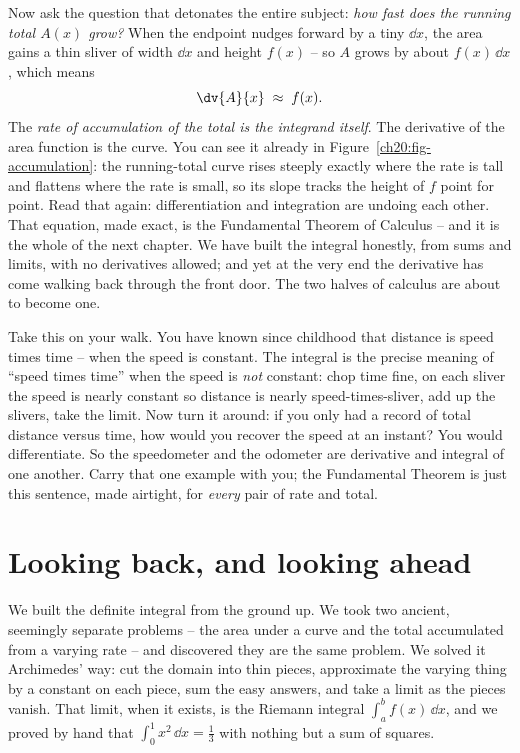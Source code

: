 Now ask the question that detonates the entire subject: \emph{how fast does the
running total $A(x)$ grow?} When the endpoint nudges forward by a tiny $\dd x$,
the area gains a thin sliver of width $\dd x$ and height $f(x)$ -- so
$A$ grows by about $f(x)\,\dd x$, which means
\[
  \dv{A}{x} \;\approx\; f(x).
\]
The \emph{rate of accumulation of the total is the integrand itself}. The
derivative of the area function is the curve. You can see it already in
Figure~\ref{ch20:fig-accumulation}: the running-total curve rises steeply
exactly where the rate is tall and flattens where the rate is small, so its
slope tracks the height of $f$ point for point. Read that again: differentiation
and integration are undoing each other. That equation, made exact, is the
Fundamental Theorem of Calculus -- and it is the whole of the next chapter. We
have built the integral honestly, from sums and limits, with no derivatives
allowed; and yet at the very end the derivative has come walking back through the
front door. The two halves of calculus are about to become one.

\begin{walkbox}
Take this on your walk. You have known since childhood that distance is speed
times time -- when the speed is constant. The integral is the precise meaning of
``speed times time'' when the speed is \emph{not} constant: chop time fine, on
each sliver the speed is nearly constant so distance is nearly speed-times-sliver,
add up the slivers, take the limit. Now turn it around: if you only had a record
of total distance versus time, how would you recover the speed at an instant? You
would differentiate. So the speedometer and the odometer are derivative and
integral of one another. Carry that one example with you; the Fundamental Theorem
is just this sentence, made airtight, for \emph{every} pair of rate and total.
\end{walkbox}

\section{Looking back, and looking ahead}
\label{ch20:summary}

We built the definite integral from the ground up. We took two ancient,
seemingly separate problems -- the area under a curve and the total accumulated
from a varying rate -- and discovered they are the same problem. We solved it
Archimedes' way: cut the domain into thin pieces, approximate the varying thing
by a constant on each piece, sum the easy answers, and take a limit as the pieces
vanish. That limit, when it exists, is the Riemann integral
$\int_a^b f(x)\,\dd x$, and we proved by hand that $\int_0^1 x^2\,\dd x =
\tfrac13$ with nothing but a sum of squares.

